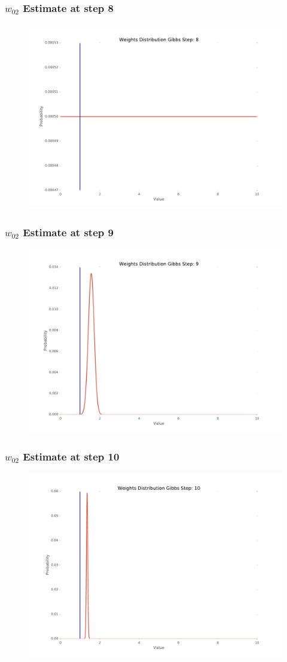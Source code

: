 \documentclass{beamer}
\begin{document}
\begin{frame}
\frametitle{$w_{02}$ Estimate at step 8}
\begin{figure}
\includegraphics[width=0.8\linewidth]{figs/8_WeDistr}
\end{figure}
\end{frame}

\begin{frame}
\frametitle{$w_{02}$ Estimate at step 9}
\begin{figure}
\includegraphics[width=0.8\linewidth]{figs/9_WeDistr}
\end{figure}
\end{frame}

\begin{frame}
\frametitle{$w_{02}$ Estimate at step 10}
\begin{figure}
\includegraphics[width=0.8\linewidth]{figs/10_WeDistr}
\end{figure}
\end{frame}
\end{document}
